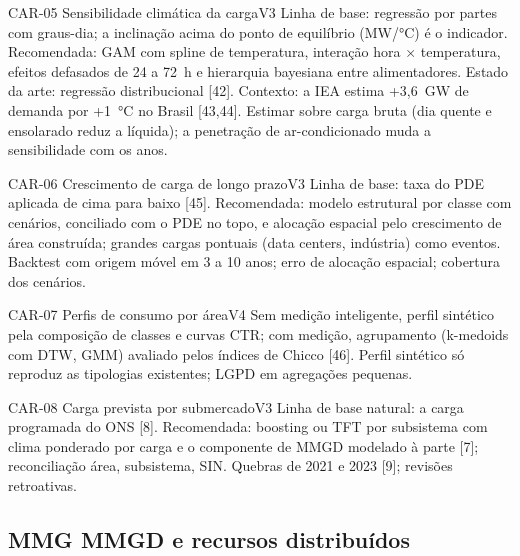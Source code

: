 \begin{ficha}{CAR-05 \textperiodcentered{} Sensibilidade climática da carga}{V3}
 Linha de base: regressão por partes com graus-dia; a
inclinação acima do ponto de equilíbrio (MW/°C) é o indicador. Recomendada:
GAM com spline de temperatura, interação hora × temperatura, efeitos
defasados de 24 a 72~h e hierarquia bayesiana entre alimentadores. Estado da
arte: regressão distribucional [42]. Contexto: a IEA estima +3,6~GW de demanda
por +1~°C no Brasil [43,44].
 Estimar sobre carga bruta (dia quente e ensolarado reduz
a líquida); a penetração de ar-condicionado muda a sensibilidade com os anos.
\end{ficha}

\begin{ficha}{CAR-06 \textperiodcentered{} Crescimento de carga de longo prazo}{V3}
 Linha de base: taxa do PDE aplicada de cima para baixo
[45]. Recomendada: modelo estrutural por classe com cenários, conciliado com
o PDE no topo, e alocação espacial pelo crescimento de área construída;
grandes cargas pontuais (data centers, indústria) como eventos.
 Backtest com origem móvel em 3 a 10 anos; erro de alocação
espacial; cobertura dos cenários.
\end{ficha}

\begin{ficha}{CAR-07 \textperiodcentered{} Perfis de consumo por área}{V4}
 Sem medição inteligente, perfil sintético pela composição
de classes e curvas CTR; com medição, agrupamento (k-medoids com DTW, GMM)
avaliado pelos índices de Chicco [46].
 Perfil sintético só reproduz as tipologias existentes;
LGPD em agregações pequenas.
\end{ficha}

\begin{ficha}{CAR-08 \textperiodcentered{} Carga prevista por submercado}{V3}
 Linha de base natural: a carga programada do ONS [8].
Recomendada: boosting ou TFT por subsistema com clima ponderado por carga e o
componente de MMGD modelado à parte [7]; reconciliação área, subsistema, SIN.
 Quebras de 2021 e 2023 [9]; revisões retroativas.
\end{ficha}

\subsection{MMG \textperiodcentered{} MMGD e recursos distribuídos}

